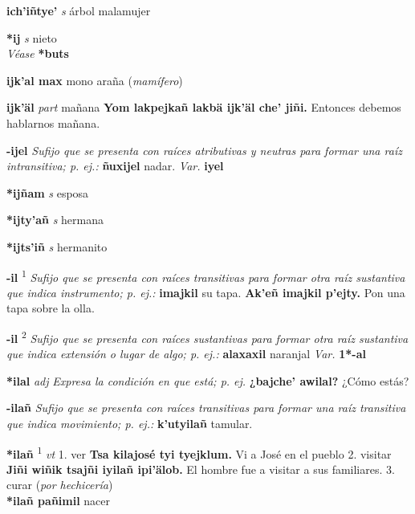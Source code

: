 \documentclass[10pt]{scrbook}
\newcommand{\entry}[1]{\textbf{#1}}
\newcommand{\onedefinition}[1]{#1.}
\newcommand{\defsuperscript}[1]{\textsuperscript{#1}}
\newcommand{\nontranslationdef}[1]{\textit{#1}}
\newcommand{\partofspeech}[1]{\textit{#1}}
\newcommand{\spanishtranslation}[1]{#1}
\newcommand{\clarification}[1]{(\textit{#1})}
\newcommand{\cholexample}[1]{\textbf{#1}}
\newcommand{\exampletranslation}[1]{#1}
\newcommand{\alsosee}[1]{\\\textit{Véase} \textbf{#1}}
\newcommand{\secondaryentry}[1]{\\\textbf{#1}}
\newcommand{\secondtranslation}[1]{#1}
\newcommand{\variation}[1]{\textit{Var.} \textbf{#1}}
\begin{document}
\begin{multicols}{2}
\entry{ich'iñtye'}
\partofspeech{s}
\spanishtranslation{árbol malamujer}

\entry{*ij}
\partofspeech{s}
\spanishtranslation{nieto}
\alsosee{*buts}

\entry{ijk'al max}
\spanishtranslation{mono araña}
\clarification{mamífero}

\entry{ijk'äl}
\partofspeech{part}
\spanishtranslation{mañana}
\cholexample{Yom lakpejkañ lakbä ijk'äl che' jiñi.}
\exampletranslation{Entonces debemos hablarnos mañana.}

\entry{-ijel}
\nontranslationdef{Sufijo que se presenta con raíces atributivas y neutras para formar una raíz intransitiva; p. ej.:}
\cholexample{ñuxijel}
\exampletranslation{nadar.}
\variation{iyel}

\entry{*ijñam}
\partofspeech{s}
\spanishtranslation{esposa}

\entry{*ijty'añ}
\partofspeech{s}
\spanishtranslation{hermana}

\entry{*ijts'iñ}
\partofspeech{s}
\spanishtranslation{hermanito}

\entry{-il}
\defsuperscript{1}
\nontranslationdef{Sufijo que se presenta con raíces transitivas para formar otra raíz sustantiva que indica instrumento; p. ej.:}
\cholexample{imajkil}
\exampletranslation{su tapa.}
\cholexample{Ak'eñ imajkil p'ejty.}
\exampletranslation{Pon una tapa sobre la olla.}

\entry{-il}
\defsuperscript{2}
\nontranslationdef{Sufijo que se presenta con raíces sustantivas para formar otra raíz sustantiva que indica extensión o lugar de algo; p. ej.:}
\cholexample{alaxaxil}
\exampletranslation{naranjal}
\variation{1*-al}

\entry{*ilal}
\partofspeech{adj}
\nontranslationdef{Expresa la condición en que está; p. ej.}
\cholexample{¿bajche' awilal?}
\exampletranslation{¿Cómo estás?}

\entry{-ilañ}
\nontranslationdef{Sufijo que se presenta con raíces transitivas para formar una raíz transitiva que indica movimiento; p. ej.:}
\cholexample{k'utyilañ}
\exampletranslation{tamular.}

\entry{*ilañ}
\defsuperscript{1}
\partofspeech{vt}
\onedefinition{1}
\spanishtranslation{ver}
\cholexample{Tsa kilajosé tyi tyejklum.}
\exampletranslation{Vi a José en el pueblo}
\onedefinition{2}
\spanishtranslation{visitar}
\cholexample{Jiñi wiñik tsajñi iyilañ ipi'älob.}
\exampletranslation{El hombre fue a visitar a sus familiares.}
\onedefinition{3}
\spanishtranslation{curar}
\clarification{por hechicería}
\secondaryentry{*ilañ pañimil}
\secondtranslation{nacer}


\end{multicols}
\end{document}
